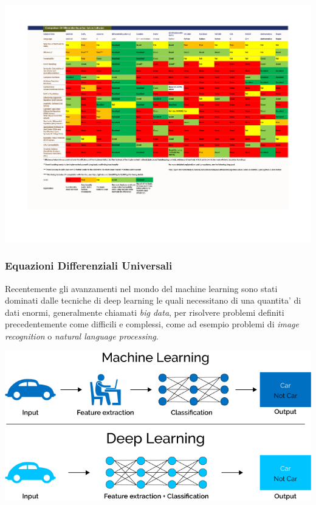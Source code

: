 \begin{minipage}{\linewidth}
    \centering
    \includegraphics[width=\textwidth]{img/de_solver_software_comparsion.pdf}
    \label{fig:de_comparison_table}
\end{minipage}

\subsubsection*{Equazioni Differenziali Universali}
Recentemente gli avanzamenti nel mondo del machine learning sono stati dominati dalle tecniche 
di deep learning le quali necessitano di una quantita' di dati enormi, generalmente chiamati \emph{big data}, 
per risolvere problemi definiti precedentemente come difficili e complessi, come ad esempio problemi di 
\emph{image recognition} o \emph{natural language processing}. 

\begin{minipage}{\linewidth}
    \centering
    \includegraphics[width=\textwidth]{img/Caratteristiche-e-funzionamento-del-Deep-Learning-in-informatica.png}
    \label{fig:ml_dl_example}
\end{minipage}

